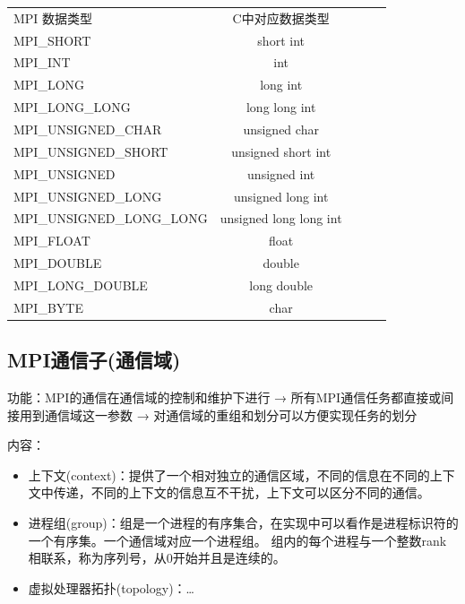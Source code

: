 \documentclass[UTF8]{article}%
\begin{document}
\begin{tabular}{l c c c r}
    MPI 数据类型                 &	C中对应数据类型           \\
    MPI\_SHORT                  &	short int               \\
    MPI\_INT	                &   int                     \\
    MPI\_LONG	                &   long int                \\
    MPI\_LONG\_LONG	            &   long long int           \\
    MPI\_UNSIGNED\_CHAR         &	unsigned char           \\
    MPI\_UNSIGNED\_SHORT	    &   unsigned short int      \\
    MPI\_UNSIGNED	            &   unsigned int            \\
    MPI\_UNSIGNED\_LONG	        &   unsigned long int       \\
    MPI\_UNSIGNED\_LONG\_LONG	&   unsigned long long int  \\
    MPI\_FLOAT	                &   float                   \\
    MPI\_DOUBLE	                &   double                  \\
    MPI\_LONG\_DOUBLE	        &   long double             \\
    MPI\_BYTE	                &   char                    \\
\end{tabular}


\subsection{MPI通信子(通信域)}

功能：MPI的通信在通信域的控制和维护下进行 → 所有MPI通信任务都直接或间接用到通信域这一参数 → 对通信域的重组和划分可以方便实现任务的划分

内容：
\begin{itemize}
    \item 上下文(context)：提供了一个相对独立的通信区域，不同的信息在不同的上下文中传递，不同的上下文的信息互不干扰，上下文可以区分不同的通信。
    \item 进程组(group)：组是一个进程的有序集合，在实现中可以看作是进程标识符的一个有序集。一个通信域对应一个进程组。
组内的每个进程与一个整数rank相联系，称为序列号，从0开始并且是连续的。
    \item 虚拟处理器拓扑(topology)：\dots
\end{itemize}
\end{document}
